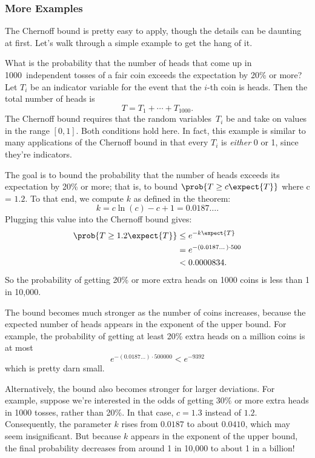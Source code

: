 \subsubsection{More Examples}

The Chernoff bound is pretty easy to apply, though the details can be
daunting at first.  Let's walk through a simple example to get the
hang of it.

What is the probability that the number of heads that come up in
1000~independent tosses of a fair coin exceeds the expectation by 20\%
or more?  Let $T_i$ be an indicator variable for the event that the
$i$-th coin is heads.  Then the total number of heads is
\begin{equation*}
    T = T_1 + \cdots + T_{1000}.
\end{equation*}
The Chernoff bound requires that the random variables~$T_i$ be
 and take on values in the range $[0, 1]$.
Both conditions hold here.  In fact, this example is similar to many
applications of the Chernoff bound in that every $T_i$ is
\emph{either} 0 or 1, since they're indicators.

The goal is to bound the probability that the number of heads exceeds
its expectation by 20\% or more; that is, to bound $\prob{T \geq c
  \expect{T}}$ where c = $1.2$.  To that end, we compute $k$ as
defined in the theorem:
\[
k = c \ln(c) - c + 1 = 0.0187\dots.
\]
Plugging this value into the Chernoff bound gives:
\begin{align*}
\prob{T \geq 1.2 \expect{T}} & \leq  e^{- k \expect{T}} \\
  & = e^{- (0.0187\dots) \cdot 500} \\
  & <  0.0000834.
\end{align*}
So the probability of getting 20\% or more extra heads on 1000 coins is
less than 1 in 10,000.

The bound becomes much stronger as the number of coins increases,
because the expected number of heads appears in the exponent of the
upper bound.  For example, the probability of getting at least 20\%
extra heads on a million coins is at most
\[
e^{- (0.0187\dots) \cdot 500000} < e^{-9392}
\]
which is pretty darn small.

Alternatively, the bound also becomes stronger for larger deviations.
For example, suppose we're interested in the odds of getting 30\% or
more extra heads in 1000 tosses, rather than 20\%.  In that case,
$c= 1.3$ instead of $1.2$.  Consequently, the parameter $k$ rises from
$0.0187$ to about $0.0410$, which may seem insignificant.  But because
$k$ appears in the exponent of the upper bound, the final probability
decreases from around 1 in 10,000 to about 1 in a billion!

